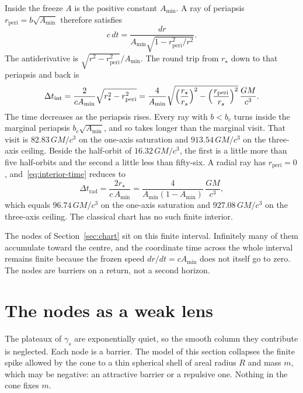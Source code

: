 \documentclass[a4paper]{article}
\begin{document}
Inside the freeze \(A\) is the positive constant \(A_{\min}\). A ray of periapsis \(r_{\mathrm{peri}}=b\sqrt{A_{\min}}\) therefore satisfies
\[
c\,dt=\frac{dr}{A_{\min}\sqrt{1-r_{\mathrm{peri}}^2/r^2}}.
\]
The antiderivative is \(\sqrt{r^2-r_{\mathrm{peri}}^2}/A_{\min}\). The round trip from \(r_\star\) down to that periapsis and back is
\begin{equation}
\label{eq:interior-time}
\Delta t_{\mathrm{int}}
  =\frac{2}{c A_{\min}}\sqrt{r_\star^2-r_{\mathrm{peri}}^2}
  =\frac{4}{A_{\min}}
    \sqrt{\Bigl(\frac{r_\star}{r_s}\Bigr)^2
      -\Bigl(\frac{r_{\mathrm{peri}}}{r_s}\Bigr)^2}
    \,\frac{GM}{c^3}.
\end{equation}
The time decreases as the periapsis rises. Every ray with \(b<b_c\) turns inside the marginal periapsis \(b_c\sqrt{A_{\min}}\), and so takes longer than the marginal visit. That visit is \(82.83\,GM/c^3\) on the one-axis saturation and \(913.54\,GM/c^3\) on the three-axis ceiling. Beside the half-orbit of \(16.32\,GM/c^3\), the first is a little more than five half-orbits and the second a little less than fifty-six. A radial ray has \(r_{\mathrm{peri}}=0\), and~\eqref{eq:interior-time} reduces to
\begin{equation}
\label{eq:interior-radial}
\Delta t_{\mathrm{rad}}=\frac{2r_\star}{c\,A_{\min}}
  =\frac{4}{A_{\min}(1-A_{\min})}\,\frac{GM}{c^3},
\end{equation}
which equals \(96.74\,GM/c^3\) on the one-axis saturation and \(927.08\,GM/c^3\) on the three-axis ceiling. The classical chart has no such finite interior.

The nodes of Section~\ref{sec:chart} sit on this finite interval. Infinitely many of them accumulate toward the centre, and the coordinate time across the whole interval remains finite because the frozen speed \(dr/dt=c A_{\min}\) does not itself go to zero. The nodes are barriers on a return, not a second horizon.

\section{The nodes as a weak lens}
\label{sec:shells}

The plateaux of \(\gamma_s\) are exponentially quiet, so the smooth column they contribute is neglected. Each node is a barrier. The model of this section collapses the finite spike allowed by the cone to a thin spherical shell of areal radius \(R\) and mass \(m\), which may be negative: an attractive barrier or a repulsive one. Nothing in the cone fixes \(m\).
\end{document}
